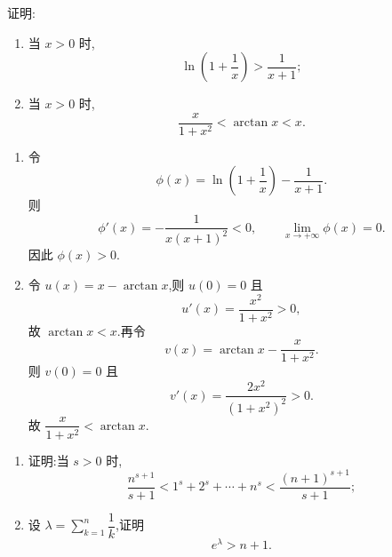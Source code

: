 
\begin{example}
    证明:
    \begin{enumerate}
        \item 当 $x>0$ 时,
              \[
                  \ln\left(1+\dfrac{1}{x}\right)>\dfrac{1}{x+1};
              \]
        \item 当 $x>0$ 时,
              \[
                  \dfrac{x}{1+x^2}<\arctan x<x.
              \]
    \end{enumerate}
\end{example}
\exampleblank

\begin{solution}
    \begin{enumerate}
        \item 令
              \[
                  \phi(x)=\ln\left(1+\dfrac{1}{x}\right)-\dfrac{1}{x+1}.
              \]
              则
              \[
                  \phi'(x)=-\dfrac{1}{x(x+1)^2}<0,
                  \qquad
                  \lim\limits_{x\to+\infty}\phi(x)=0.
              \]
              因此 $\phi(x)>0$.

        \item 令 $u(x)=x-\arctan x$,则 $u(0)=0$ 且
              \[
                  u'(x)=\dfrac{x^2}{1+x^2}>0,
              \]
              故 $\arctan x<x$.再令
              \[
                  v(x)=\arctan x-\dfrac{x}{1+x^2}.
              \]
              则 $v(0)=0$ 且
              \[
                  v'(x)=\dfrac{2x^2}{(1+x^2)^2}>0.
              \]
              故 $\dfrac{x}{1+x^2}<\arctan x$.
    \end{enumerate}
\end{solution}

\begin{example}
    \begin{enumerate}
        \item 证明:当 $s>0$ 时,
              \[
                  \dfrac{n^{s+1}}{s+1}
                  <1^s+2^s+\cdots+n^s
                  <\dfrac{(n+1)^{s+1}}{s+1};
              \]
        \item 设 $\displaystyle\lambda=\sum\limits_{k=1}^n\dfrac{1}{k}$,证明
              \[
                  e^\lambda>n+1.
              \]
    \end{enumerate}
\end{example}
\exampleblank

